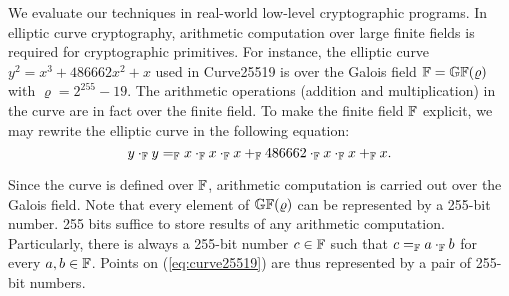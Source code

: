 
We evaluate our techniques in real-world low-level cryptographic
programs. In elliptic curve cryptography, arithmetic computation over
large finite fields is required for cryptographic primitives. For
instance, the elliptic curve $y^2 = x^3 + 486662 x^2 + x$ used in 
Curve25519 is over the Galois field $\mathbb{F} = \mathbb{GF}(\varrho)$ with
$\varrho = 2^{255} - 19$. The arithmetic operations (addition and
multiplication) in the curve are in fact over the finite field. To
make the finite field $\mathbb{F}$ explicit, we may rewrite the elliptic
curve in the following equation: 
\begin{equation}
  \label{eq:curve25519}
  y \cdot_{\mathbb{F}} y =_{\mathbb{F}} x \cdot_{\mathbb{F}} x \cdot_{\mathbb{F}} x +_{\mathbb{F}}
  486662 \cdot_{\mathbb{F}} x \cdot_{\mathbb{F}} x +_{\mathbb{F}} x.
\end{equation}

Since the curve is defined over $\mathbb{F}$, arithmetic computation is
carried out over the Galois field. Note that every element of 
$\mathbb{GF}(\varrho)$ can be represented by a 255-bit number. 255 bits
suffice to store results of any arithmetic computation. Particularly,
there is always a 255-bit number $c \in \mathbb{F}$ such that $c =_{\mathbb{F}} a
\cdot_{\mathbb{F}} b$ for every $a, b \in \mathbb{F}$. Points on
(\ref{eq:curve25519}) are thus represented by a pair of 255-bit numbers.